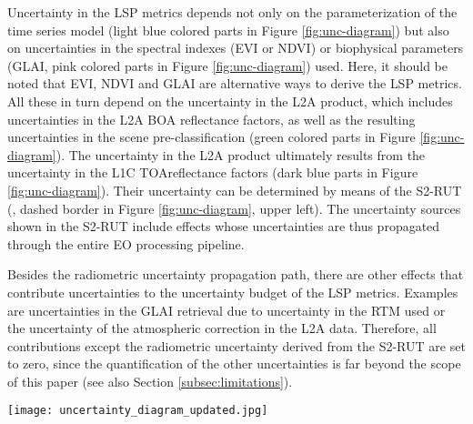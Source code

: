 Uncertainty in the \gls{LSP} metrics depends not only on the parameterization of the time series model (light blue colored parts in Figure \ref{fig:unc-diagram}) but also on uncertainties in the spectral indexes (\gls{EVI}  or NDVI) or biophysical parameters (GLAI, pink colored parts in Figure \ref{fig:unc-diagram}) used. Here, it should be noted that EVI, \gls{NDVI} and \gls{GLAI} are alternative ways to derive the \gls{LSP} metrics. All these in turn depend on the uncertainty in the L2A product, which includes uncertainties in the L2A BOA reflectance factors, as well as the resulting uncertainties in the scene pre-classification (green colored parts in Figure \ref{fig:unc-diagram}). The uncertainty in the L2A product ultimately results from the uncertainty in the L1C \gls{TOA}reflectance factors (dark blue parts in Figure \ref{fig:unc-diagram}). Their uncertainty can be determined by means of the \gls{S2-RUT} (\cite{gorrono_radiometric_2017}, dashed border in Figure \ref{fig:unc-diagram}, upper left). The uncertainty sources shown in the \gls{S2-RUT} include effects whose uncertainties are thus propagated through the entire \gls{EO} processing pipeline.

Besides the radiometric uncertainty propagation path, there are other effects that contribute uncertainties to the uncertainty budget of the \gls{LSP} metrics. Examples are uncertainties in the \gls{GLAI} retrieval due to uncertainty in the RTM used or the uncertainty of the atmospheric correction in the L2A data. Therefore, all contributions except the radiometric uncertainty derived from the \gls{S2-RUT} are set to zero, since the quantification of the other uncertainties is far beyond the scope of this paper (see also Section \ref{subsec:limitations}).

\begin{figure*}
    \centering
    \texttt{[image: uncertainty\_diagram\_updated.jpg]}
    \caption{Uncertainty tree diagram of uncertainty in \gls{LSP} metrics derived from multi-temporal \gls{S2} data (blue box). Processing levels defined by the Committee on Earth Observing Satellites (CEOS) are color-coded starting at L1C (dark blue) and ending at the \gls{LSP} metrics (L3). Partial derivatives represent sensitivity coefficients showing how uncertainty propagates from certain source effects into the end product. Uncertainty contributors not considered in this study are indicated by $\mu(0)$.}
    \label{fig:unc-diagram}
\end{figure*}


